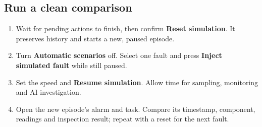 \subsection*{Run a clean comparison}
\begin{enumerate}
\item Wait for pending actions to finish, then confirm \textbf{Reset simulation}. It preserves history and starts a new, paused episode.
\item Turn \textbf{Automatic scenarios} off. Select one fault and press \textbf{Inject simulated fault} while still paused.
\item Set the speed and \textbf{Resume simulation}. Allow time for sampling, monitoring and AI investigation.
\item Open the new episode's alarm and task. Compare its timestamp, component, readings and inspection result; repeat with a reset for the next fault.
\end{enumerate}
